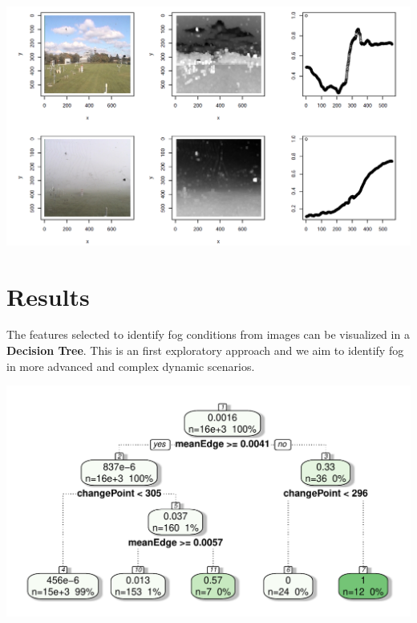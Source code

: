\documentclass{article}
\begin{document}
\begin{minipage}[b]{\columnwidth}
	\begin{center}
	\includegraphics[width=0.95\columnwidth]{transmission}
	\label{figTransmission}
	\end{center}
\end{minipage}


\section*{Results}
The features selected to identify fog conditions from images can be visualized in a \textbf{Decision Tree}. 
This is an first exploratory approach and we aim to identify fog in more advanced and complex dynamic scenarios.

\begin{minipage}[b]{\columnwidth}
	\begin{center}
	\includegraphics[width=0.9\columnwidth]{ClassificationTree-1}
	\label{figTree}
	\end{center}
\end{minipage}
\end{document}
